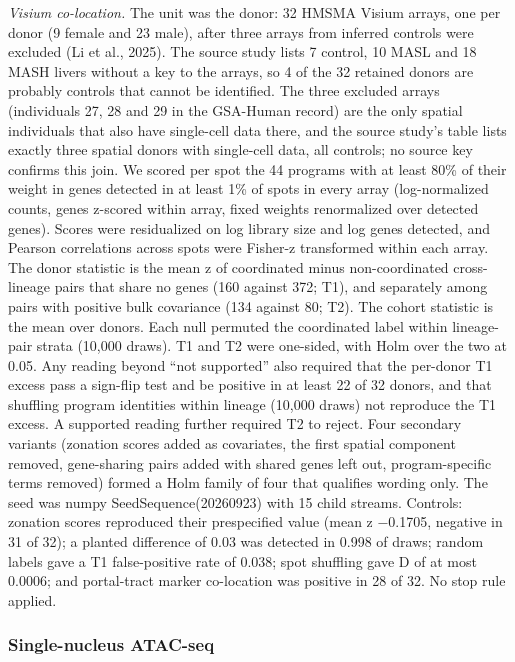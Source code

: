 \emph{Visium co-location.} The unit was the donor: 32 HMSMA Visium arrays, one per donor (9 female and 23 male), after three arrays from inferred controls were excluded (Li et al., 2025). The source study lists 7 control, 10 MASL and 18 MASH livers without a key to the arrays, so 4 of the 32 retained donors are probably controls that cannot be identified. The three excluded arrays (individuals 27, 28 and 29 in the GSA-Human record) are the only spatial individuals that also have single-cell data there, and the source study's table lists exactly three spatial donors with single-cell data, all controls; no source key confirms this join. We scored per spot the 44 programs with at least 80\% of their weight in genes detected in at least 1\% of spots in every array (log-normalized counts, genes z-scored within array, fixed weights renormalized over detected genes). Scores were residualized on log library size and log genes detected, and Pearson correlations across spots were Fisher-z transformed within each array. The donor statistic is the mean z of coordinated minus non-coordinated cross-lineage pairs that share no genes (160 against 372; T1), and separately among pairs with positive bulk covariance (134 against 80; T2). The cohort statistic is the mean over donors. Each null permuted the coordinated label within lineage-pair strata (10,000 draws). T1 and T2 were one-sided, with Holm over the two at 0.05. Any reading beyond ``not supported'' also required that the per-donor T1 excess pass a sign-flip test and be positive in at least 22 of 32 donors, and that shuffling program identities within lineage (10,000 draws) not reproduce the T1 excess. A supported reading further required T2 to reject. Four secondary variants (zonation scores added as covariates, the first spatial component removed, gene-sharing pairs added with shared genes left out, program-specific terms removed) formed a Holm family of four that qualifies wording only. The seed was numpy SeedSequence(20260923) with 15 child streams. Controls: zonation scores reproduced their prespecified value (mean z −0.1705, negative in 31 of 32); a planted difference of 0.03 was detected in 0.998 of draws; random labels gave a T1 false-positive rate of 0.038; spot shuffling gave \textbar D\textbar{} of at most 0.0006; and portal-tract marker co-location was positive in 28 of 32. No stop rule applied.

\subsubsection{Single-nucleus ATAC-seq}\label{single-nucleus-atac-seq}

